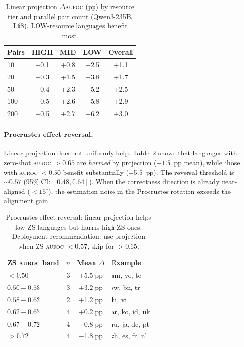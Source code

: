 \documentclass[11pt,a4paper]{article}
\newcommand{\aur}{\textsc{auroc}}
\begin{document}
\begin{table}[t]
\centering
\small
\begin{tabular}{lcccc}
\toprule
\textbf{Pairs} & \textbf{HIGH} & \textbf{MID} & \textbf{LOW} & \textbf{Overall} \\
\midrule
10  & +0.1 & +0.8 & +2.5 & +1.1 \\
20  & +0.3 & +1.5 & +3.8 & +1.7 \\
50  & +0.4 & +2.3 & +5.2 & +2.5 \\
100 & +0.5 & +2.6 & +5.8 & +2.9 \\
200 & +0.5 & +2.7 & +6.2 & +3.0 \\
\bottomrule
\end{tabular}
\caption{Linear projection $\Delta$\aur{} (pp) by resource tier and parallel pair count (Qwen3-235B, L68). LOW-resource languages benefit most.}
\label{tab:saturation}
\end{table}

\paragraph{Procrustes effect reversal.}
Linear projection does not uniformly help. Table~\ref{tab:reversal} shows that languages with zero-shot \aur{} $> 0.65$ are \emph{harmed} by projection ($-1.5$~pp mean), while those with \aur{} $< 0.50$ benefit substantially (+5.5~pp). The reversal threshold is ${\sim}0.57$ (95\% CI: $[0.48, 0.64]$). When the correctness direction is already near-aligned ($< 15^\circ$), the estimation noise in the Procrustes rotation exceeds the alignment gain.

\begin{table}[t]
\centering
\small
\begin{tabular}{lccl}
\toprule
\textbf{ZS \aur{} band} & \textbf{$n$} & \textbf{Mean $\Delta$} & \textbf{Example} \\
\midrule
$< 0.50$ & 3 & +5.5 pp & am, yo, te \\
$0.50{-}0.58$ & 3 & +3.2 pp & sw, bn, tr \\
$0.58{-}0.62$ & 2 & +1.2 pp & hi, vi \\
$0.62{-}0.67$ & 4 & +0.2 pp & ar, ko, id, uk \\
$0.67{-}0.72$ & 4 & $-$0.8 pp & ru, ja, de, pt \\
$> 0.72$ & 4 & $-$1.8 pp & zh, es, fr, nl \\
\bottomrule
\end{tabular}
\caption{Procrustes effect reversal: linear projection helps low-ZS languages but harms high-ZS ones. Deployment recommendation: use projection when ZS \aur{} $< 0.57$, skip for $> 0.65$.}
\label{tab:reversal}
\end{table}
\end{document}

